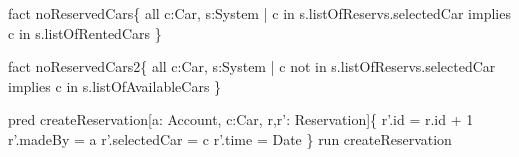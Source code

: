 \documentclass[a4paper]{article}
\begin{document}
fact noReservedCars\{ \newline
\hspace*{5 mm}	all c:Car, s:System | \newline
\hspace*{5 mm}	c in s.listOfReservs.selectedCar \newline
\hspace*{5 mm}	implies \newline
\hspace*{5 mm}	c in s.listOfRentedCars \newline
\} \newline

fact noReservedCars2\{ \newline
\hspace*{5 mm}	all c:Car, s:System | \newline
\hspace*{5 mm}	c not in s.listOfReservs.selectedCar \newline
\hspace*{5 mm}	implies \newline
\hspace*{5 mm}	c in s.listOfAvailableCars \newline
\} \newline

pred createReservation[a: Account, c:Car, r,r': Reservation]\{ \newline
\hspace*{5 mm}		r'.id = r.id + 1 \newline
\hspace*{5 mm}		r'.madeBy = a \newline 
\hspace*{5 mm}		r'.selectedCar = c \newline 
\hspace*{5 mm}		r'.time = Date \newline
\} \newline
run createReservation \newline
\end{document}
